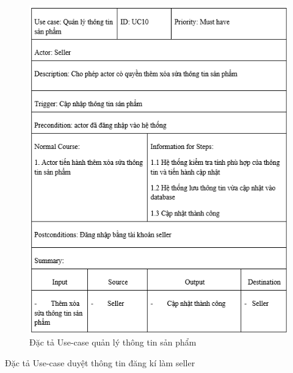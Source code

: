 \documentclass{article}
\begin{document}
{{{{{{{{{{	\begin{center}
		\begin{figure}[htp]
			\begin{center}
				\includegraphics[scale=.900]{anh20.png}
			\end{center}
			\caption{Đặc tả Use-case quản lý thông tin sản phẩm}
			
		\end{figure}
	\end{center}
\newpage
{\large Đặc tả Use-case duyệt thông tin đăng kí làm seller
	
}}}}}}}}}}}
\end{document}
